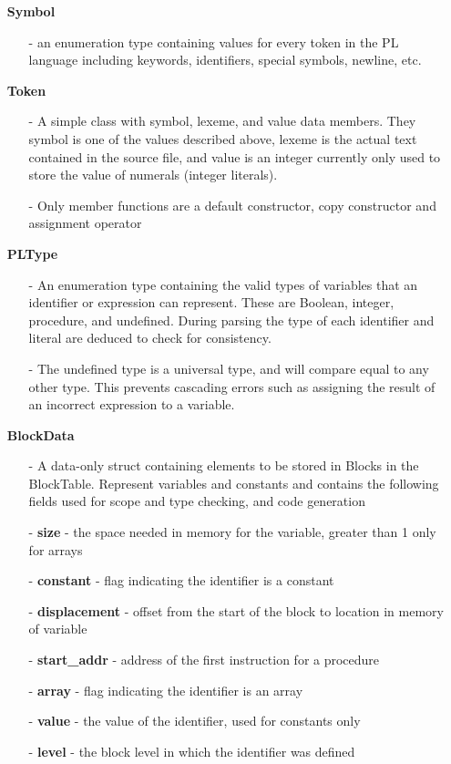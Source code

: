 \documentclass{article}
\let\bf\textbf
\begin{document}
\begin{itemize}
    \item[] \textbf{Symbol}
        \begin{itemize}
            \item[-] an enumeration type containing values for every  token in the PL language including keywords, identifiers, special symbols, newline, etc.
        \end{itemize} 
    \item[] \textbf{Token} 
        \begin{itemize}
            \item[-] A simple class with symbol, lexeme, and value data members. They symbol is one of the values described above, lexeme is the actual text contained in the source file, and value is an integer currently only used to store the value of numerals (integer literals).
        \item[-] Only member functions are a default constructor, copy constructor and assignment operator 
        \end{itemize} 
    \item[] \textbf{PLType}
        \begin{itemize}
            \item[-] An enumeration type containing the valid types of variables that an identifier or expression can represent. These are Boolean, integer, procedure, and undefined. During parsing the type of each identifier and literal are deduced to check for consistency. 
            \item[-] The undefined type is a universal type, and will compare equal to any other type. This prevents cascading errors such as assigning the result of an incorrect expression to a variable.
        \end{itemize}
    \item[] \textbf{BlockData}
        \begin{itemize}
            \item[-] A data-only struct containing elements to be stored in Blocks in the BlockTable. Represent variables and constants and  contains the following fields used for scope and type checking, and code generation
            \item[-] \bf{size} - the space needed in memory for the variable, greater than 1 only for arrays
            \item[-] \bf{constant} - flag indicating the identifier is a constant
            \item[-] \bf{displacement} - offset from the start of the block to location in memory of variable
            \item[-] \bf{start\_addr} - address of the first instruction for a procedure
            \item[-] \bf{array} - flag indicating the identifier is an array
            \item[-] \bf{value} - the value of the identifier, used for constants only
            \item[-] \bf{level} - the block level in which the identifier was defined
        \end{itemize}
\end{itemize}
\end{document}

